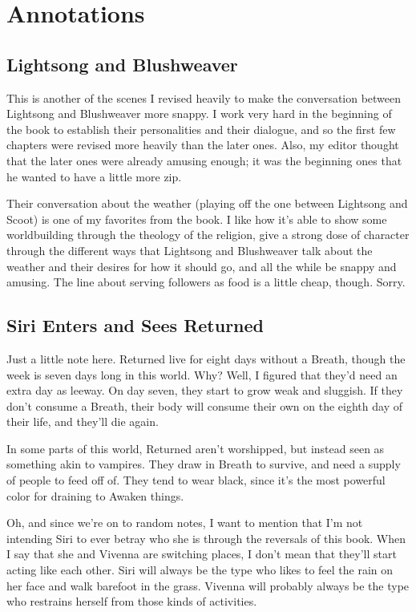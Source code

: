 \section*{Annotations}

\subsection*{Lightsong and Blushweaver}

This is another of the scenes I revised heavily to make the conversation between Lightsong and Blushweaver more snappy. I work very hard in the beginning of the book to establish their personalities and their dialogue, and so the first few chapters were revised more heavily than the later ones. Also, my editor thought that the later ones were already amusing enough; it was the beginning ones that he wanted to have a little more zip.

Their conversation about the weather (playing off the one between Lightsong and Scoot) is one of my favorites from the book. I like how it’s able to show some worldbuilding through the theology of the religion, give a strong dose of character through the different ways that Lightsong and Blushweaver talk about the weather and their desires for how it should go, and all the while be snappy and amusing. The line about serving followers as food is a little cheap, though. Sorry.

\subsection*{Siri Enters and Sees Returned}

Just a little note here. Returned live for eight days without a Breath, though the week is seven days long in this world. Why? Well, I figured that they’d need an extra day as leeway. On day seven, they start to grow weak and sluggish. If they don’t consume a Breath, their body will consume their own on the eighth day of their life, and they’ll die again.

In some parts of this world, Returned aren’t worshipped, but instead seen as something akin to vampires. They draw in Breath to survive, and need a supply of people to feed off of. They tend to wear black, since it’s the most powerful color for draining to Awaken things.

Oh, and since we’re on to random notes, I want to mention that I’m not intending Siri to ever betray who she is through the reversals of this book. When I say that she and Vivenna are switching places, I don’t mean that they’ll start acting like each other. Siri will always be the type who likes to feel the rain on her face and walk barefoot in the grass. Vivenna will probably always be the type who restrains herself from those kinds of activities.

